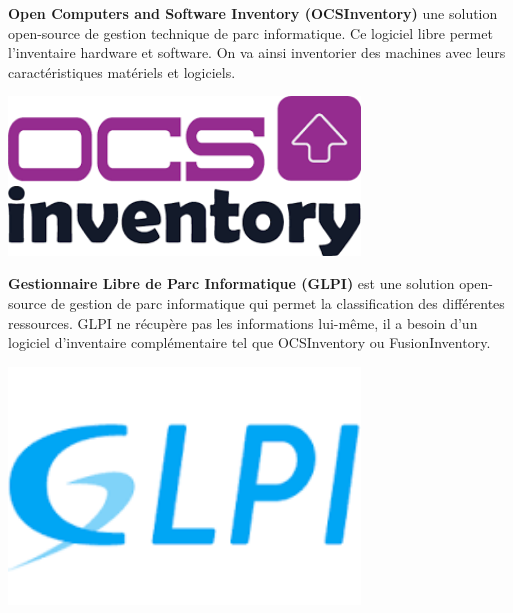 \documentclass[12pt]{article}
\begin{document}
\noindent%
\begin{minipage}{.7\textwidth}%
\textbf{Open Computers and Software Inventory (\gls{OCSInventory})} une solution open-source de gestion technique de parc informatique. 
Ce logiciel libre permet l’inventaire hardware et software. 
On va ainsi inventorier des machines avec leurs caractéristiques matériels et logiciels.
\end{minipage}%
\hfill
\begin{minipage}{.3\textwidth}%
\begin{center}
\includegraphics[width=0.7\textwidth]{src/logo_ocsinventory.png}
\end{center}
\end{minipage}%

\noindent%
\begin{minipage}{.7\textwidth}%
\textbf{Gestionnaire Libre de Parc Informatique (\gls{GLPI})} est une solution open-source de gestion de parc informatique qui permet la classification des différentes ressources. 
GLPI ne récupère pas les informations lui-même, il a besoin d'un logiciel d'inventaire complémentaire tel que OCSInventory ou FusionInventory.
\end{minipage}%
\hfill
\begin{minipage}{.3\textwidth}%
\begin{center}
\includegraphics[width=0.7\textwidth]{src/logo_glpi.png} 
\end{center}
\end{minipage}%
\end{document}
